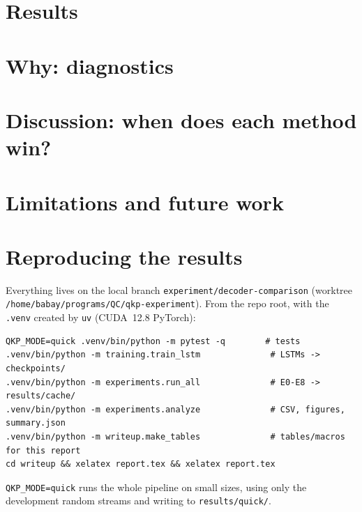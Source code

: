 \documentclass[11pt,letterpaper]{article}
\begin{document}
\begin{table}[H]
\centering\small

\caption{E0: grid convergence of the Bayes filter (matched model, 20{,}000
trials of the development split).}
\label{tab:e0}
\end{table}

\section{Results}\label{sec:results}



\section{Why: diagnostics}\label{sec:why}



\section{Discussion: when does each method win?}\label{sec:discussion}



\section{Limitations and future work}\label{sec:limits}



\appendix
\section{Reproducing the results}\label{sec:repro}

Everything lives on the local branch \nolinkurl{experiment/decoder-comparison}
(worktree \nolinkurl{/home/babay/programs/QC/qkp-experiment}). From the repo
root, with the \texttt{.venv} created by \texttt{uv} (CUDA~12.8 PyTorch):
\begin{verbatim}
QKP_MODE=quick .venv/bin/python -m pytest -q        # tests
.venv/bin/python -m training.train_lstm              # LSTMs -> checkpoints/
.venv/bin/python -m experiments.run_all              # E0-E8 -> results/cache/
.venv/bin/python -m experiments.analyze              # CSV, figures, summary.json
.venv/bin/python -m writeup.make_tables              # tables/macros for this report
cd writeup && xelatex report.tex && xelatex report.tex
\end{verbatim}
\texttt{QKP\_MODE=quick} runs the whole pipeline on small sizes, using only
the development random streams and writing to \texttt{results/quick/}.
\end{document}
